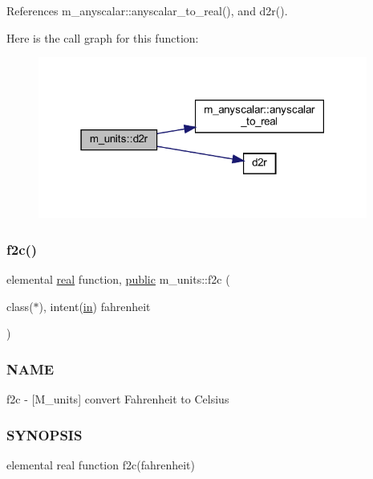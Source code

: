 References m\+\_\+anyscalar\+::anyscalar\+\_\+to\+\_\+real(), and d2r().

Here is the call graph for this function\+:
\nopagebreak
\begin{figure}[H]
\begin{center}
\leavevmode
\includegraphics[width=307pt]{namespacem__units_a51fd676dee35aafbbd777cb88c347e23_cgraph}
\end{center}
\end{figure}
\mbox{\label{namespacem__units_a8f71442bfefc89e6e4636f3a4677b796}} 
\subsubsection{\texorpdfstring{f2c()}{f2c()}}
{\footnotesize\ttfamily elemental \hyperlink{read__watch_83_8txt_abdb62bde002f38ef75f810d3a905a823}{real} function, \hyperlink{M__stopwatch_83_8txt_a2f74811300c361e53b430611a7d1769f}{public} m\+\_\+units\+::f2c (\begin{DoxyParamCaption}\item[{class($\ast$), intent(\hyperlink{M__journal_83_8txt_afce72651d1eed785a2132bee863b2f38}{in})}]{fahrenheit }\end{DoxyParamCaption})}



\subsubsection*{N\+A\+ME}

f2c -\/ \mbox{[}M\+\_\+units\mbox{]} convert Fahrenheit to Celsius \subsubsection*{S\+Y\+N\+O\+P\+S\+IS}

elemental real function f2c(fahrenheit)


